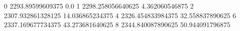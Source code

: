 0 2293.89599609375 0.0
1 2298.258056640625 4.362060546875
2 2307.932861328125 14.036865234375
4 2326.454833984375 32.558837890625
6 2337.169677734375 43.273681640625
8 2344.840087890625 50.944091796875
